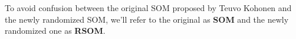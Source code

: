 To avoid confusion between the original SOM proposed by Teuvo Kohonen and the newly randomized SOM, we'll refer to the original as \textbf{SOM} and the newly randomized one as \textbf{RSOM}.





